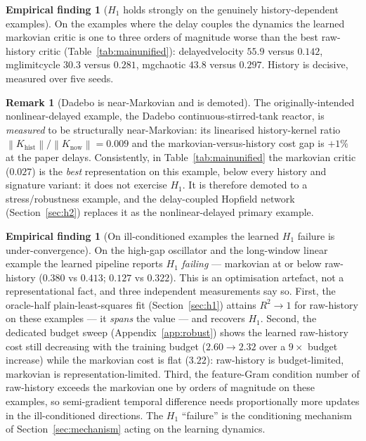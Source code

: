 \documentclass[11pt]{article}
\renewcommand{\_}{\discretionary{\textunderscore}{}{\textunderscore}}
\theoremstyle{plain}
\theoremstyle{definition}
\newtheorem{finding}[theorem]{Empirical finding}
\newtheorem{remark}[theorem]{Remark}
\newcommand{\norm}[1]{\left\lVert #1 \right\rVert}
\begin{document}
\begin{finding}[$H_1$ holds strongly on the genuinely history-dependent examples]\label{find:mu-h1}
On the examples where the delay couples the dynamics the learned markovian critic is one to three
orders of magnitude worse than the best raw-history critic (Table~\ref{tab:mainunified}):
delayed\_velocity $55.9$ versus $0.142$, mg\_limit\_cycle $30.3$ versus $0.281$, mg\_chaotic
$43.8$ versus $0.297$. History is decisive, measured over five seeds.
\end{finding}

\begin{remark}[Dadebo is near-Markovian and is demoted]\label{rem:dadebo}
The originally-intended nonlinear-delayed example, the Dadebo continuous-stirred-tank reactor, is
\emph{measured} to be structurally near-Markovian: its linearised history-kernel ratio
$\norm{K_{\mathrm{hist}}}/\norm{K_{\mathrm{now}}}=0.009$ and the markovian-versus-history cost
gap is $+1\%$ at the paper delays. Consistently, in Table~\ref{tab:mainunified} the markovian
critic ($0.027$) is the \emph{best} representation on this example, below every history and
signature variant: it does not exercise $H_1$. It is therefore demoted to a stress/robustness
example, and the delay-coupled Hopfield network (Section~\ref{sec:h2}) replaces it as the
nonlinear-delayed primary example.
\end{remark}

\begin{finding}[On ill-conditioned examples the learned $H_1$ failure is under-convergence]\label{find:underconv}
On the high-gap oscillator and the long-window linear example the learned pipeline reports $H_1$
\emph{failing} --- markovian at or below raw-history ($0.380$ vs $0.413$; $0.127$ vs $0.322$).
This is an optimisation artefact, not a representational fact, and three independent measurements
say so. First, the oracle-half plain-least-squares fit (Section~\ref{sec:h1}) attains
$R^{2}\to1$ for raw-history on these examples --- it \emph{spans} the value --- and recovers
$H_1$. Second, the dedicated budget sweep (Appendix~\ref{app:robust}) shows the learned
raw-history cost still decreasing with the training budget ($2.60\to2.32$ over a $9\times$ budget
increase) while the markovian cost is flat ($3.22$): raw-history is budget-limited, markovian is
representation-limited. Third, the feature-Gram condition number of raw-history exceeds the
markovian one by orders of magnitude on these examples, so semi-gradient temporal difference needs
proportionally more updates in the ill-conditioned directions. The $H_1$ ``failure'' is
the conditioning mechanism of Section~\ref{sec:mechanism} acting on the learning dynamics.
\end{finding}
\end{document}
